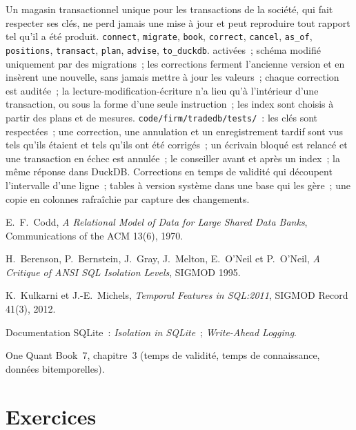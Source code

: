 \begin{build}
 Un magasin transactionnel unique pour les transactions de la société, qui fait respecter ses clés, ne perd jamais une mise à jour
et peut reproduire tout rapport tel qu'il a été produit.
 \texttt{connect}, \texttt{migrate}, \texttt{book}, \texttt{correct}, \texttt{cancel}, \texttt{as\_of},
\texttt{positions}, \texttt{transact}, \texttt{plan}, \texttt{advise}, \texttt{to\_duckdb}.
  activées~; schéma modifié uniquement par des migrations~; les corrections ferment l'ancienne version et en insèrent une nouvelle, sans jamais mettre à jour les valeurs~; chaque correction
est auditée~; la lecture-modification-écriture n'a lieu qu'à l'intérieur d'une transaction, ou sous la forme d'une seule instruction~; les index sont choisis à partir des plans et de mesures.
 \texttt{code/firm/tradedb/tests/}~: les clés sont respectées~; une correction, une annulation et un enregistrement tardif sont vus tels qu'ils étaient
et tels qu'ils ont été corrigés~; un écrivain bloqué est relancé et une transaction en échec est annulée~; le conseiller avant et après un index~; la même réponse dans
DuckDB.
 Corrections en temps de validité qui découpent l'intervalle d'une ligne~; tables à version système dans une base qui les gère~; une copie en colonnes
rafraîchie par capture des changements.
\end{build}

\begin{omsources}
\item E.~F.~Codd, \emph{A Relational Model of Data for Large Shared Data Banks}, Communications of the ACM 13(6), 1970.
\item H.~Berenson, P.~Bernstein, J.~Gray, J.~Melton, E.~O'Neil et P.~O'Neil, \emph{A Critique of ANSI SQL Isolation Levels}, SIGMOD 1995.
\item K.~Kulkarni et J.-E.~Michels, \emph{Temporal Features in SQL:2011}, SIGMOD Record 41(3), 2012.
\item Documentation SQLite~: \emph{Isolation in SQLite}~; \emph{Write-Ahead Logging}.
\item One Quant Book~7, chapitre~3 (temps de validité, temps de connaissance, données bitemporelles).
\end{omsources}

\section{Exercices}

